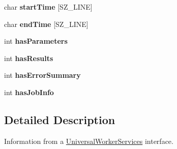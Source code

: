 \begin{CompactItemize}
\item 
\hypertarget{structUniversalWorkerServices_28cb98461e7c680dccadf7ee2216cfa2}{
char \textbf{startTime} \mbox{[}SZ\_\-LINE\mbox{]}}
\label{structUniversalWorkerServices_28cb98461e7c680dccadf7ee2216cfa2}

\item 
\hypertarget{structUniversalWorkerServices_8b275b819294a2235673ac6d3fc62e28}{
char \textbf{endTime} \mbox{[}SZ\_\-LINE\mbox{]}}
\label{structUniversalWorkerServices_8b275b819294a2235673ac6d3fc62e28}

\item 
\hypertarget{structUniversalWorkerServices_96e6f026b775ab4f1d91023c552eff7d}{
int \textbf{hasParameters}}
\label{structUniversalWorkerServices_96e6f026b775ab4f1d91023c552eff7d}

\item 
\hypertarget{structUniversalWorkerServices_02faf8ed8189c13ef5ff1306e6e6076d}{
int \textbf{hasResults}}
\label{structUniversalWorkerServices_02faf8ed8189c13ef5ff1306e6e6076d}

\item 
\hypertarget{structUniversalWorkerServices_65ae7df5a75e8fe5c2a900ad5cfa2895}{
int \textbf{hasErrorSummary}}
\label{structUniversalWorkerServices_65ae7df5a75e8fe5c2a900ad5cfa2895}

\item 
\hypertarget{structUniversalWorkerServices_5574e7165d88e12a8e73e86a991cd83e}{
int \textbf{hasJobInfo}}
\label{structUniversalWorkerServices_5574e7165d88e12a8e73e86a991cd83e}

\end{CompactItemize}


\subsection{Detailed Description}
Information from a \hyperlink{structUniversalWorkerServices}{UniversalWorkerServices} interface. 

